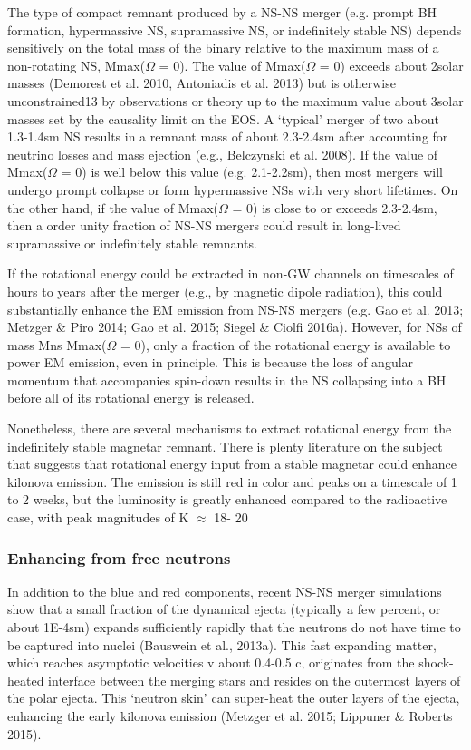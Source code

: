 The type of compact remnant produced by a NS-NS merger (e.g. prompt BH formation, hypermassive NS, supramassive NS, or indefinitely stable NS) depends sensitively on the total mass of the binary relative to the maximum mass of a non-rotating NS, Mmax($\Omega$ = 0). The value of Mmax($\Omega$ = 0) exceeds about 2solar masses (Demorest et al. 2010, Antoniadis et al. 2013) but is otherwise unconstrained13 by observations or theory up to the maximum value about 3solar masses set by the causality limit on the EOS. A `typical' merger of two about 1.3-1.4sm NS results in a remnant mass of about 2.3-2.4sm after accounting for neutrino losses and mass ejection (e.g., Belczynski et al. 2008). If the value of Mmax($\Omega$ = 0) is well below this value (e.g. 2.1-2.2sm), then most mergers will undergo prompt collapse or form hypermassive NSs with very short lifetimes. On the other hand, if the value of Mmax($\Omega$ = 0) is close to or exceeds 2.3-2.4sm, then a order unity fraction of NS-NS mergers could result in long-lived supramassive or indefinitely stable remnants.

If the rotational energy could be extracted in non-GW channels on timescales of hours to years after the merger (e.g., by magnetic dipole radiation), this could substantially enhance the EM emission from NS-NS mergers (e.g. Gao et al. 2013; Metzger \& Piro 2014; Gao et al. 2015; Siegel \& Ciolfi 2016a). However, for NSs of mass Mns   Mmax($\Omega$ = 0), only a fraction of the rotational energy is available to power EM emission, even in principle. This is because the loss of angular momentum that accompanies spin-down results in the NS collapsing into a BH before all of its rotational energy is released.

Nonetheless, there are several mechanisms to extract rotational energy from the indefinitely stable magnetar remnant.
There is plenty literature on the subject that suggests that rotational energy input from a stable magnetar could enhance kilonova emission. The emission is still red in color and peaks on a timescale of 1 to 2 weeks, but the luminosity is greatly enhanced compared to the radioactive case, with peak magnitudes of K $\approx$ 18- 20

\subsubsection{Enhancing from free neutrons}

In addition to the blue and red components, recent NS-NS merger simulations show that a small fraction of the dynamical ejecta (typically a few percent, or about 1E-4sm) expands sufficiently rapidly that the neutrons do not have time to be captured into nuclei (Bauswein et al., 2013a). This fast expanding matter, which reaches asymptotic velocities v about 0.4-0.5 c, originates from the shock- heated interface between the merging stars and resides on the outermost layers of the polar ejecta. This `neutron skin' can super-heat the outer layers of the ejecta, enhancing the early kilonova emission (Metzger et al. 2015; Lippuner \& Roberts 2015).

